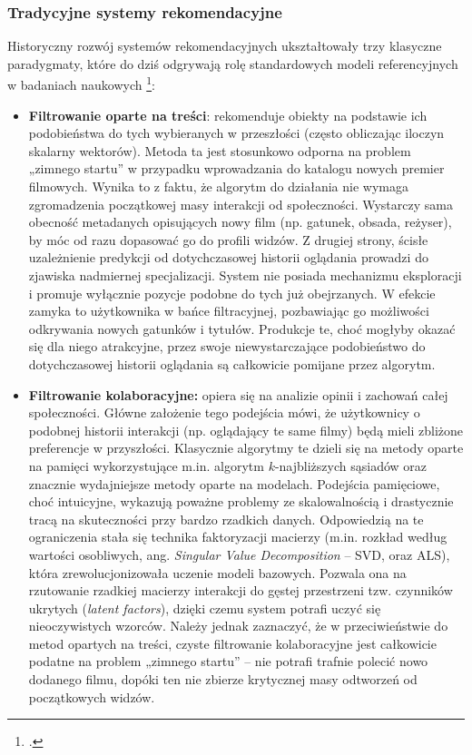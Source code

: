 \vspace{0.5cm}

\vspace{0.5cm}

\subsubsection{Tradycyjne systemy rekomendacyjne}

Historyczny rozwój systemów rekomendacyjnych ukształtowały trzy klasyczne paradygmaty, które do dziś odgrywają rolę standardowych modeli referencyjnych w badaniach naukowych \footcite{suSurveyCollaborativeFiltering2009}:
\begin{itemize}
    \item \textbf{Filtrowanie oparte na treści}: rekomenduje obiekty na podstawie ich podobieństwa do tych wybieranych w przeszłości (często obliczając iloczyn skalarny wektorów). Metoda ta jest stosunkowo odporna na problem „zimnego startu” w przypadku wprowadzania do katalogu nowych premier filmowych. Wynika to z faktu, że algorytm do działania nie wymaga zgromadzenia początkowej masy interakcji od społeczności. Wystarczy sama obecność metadanych opisujących nowy film (np. gatunek, obsada, reżyser), by móc od razu dopasować go do profili widzów. Z drugiej strony, ścisłe uzależnienie predykcji od dotychczasowej historii oglądania prowadzi do zjawiska nadmiernej specjalizacji. System nie posiada mechanizmu eksploracji i promuje wyłącznie pozycje podobne do tych już obejrzanych. W efekcie zamyka to użytkownika w bańce filtracyjnej, pozbawiając go możliwości odkrywania nowych gatunków i tytułów. Produkcje te, choć mogłyby okazać się dla niego atrakcyjne, przez swoje niewystarczające podobieństwo do dotychczasowej historii oglądania są całkowicie pomijane przez algorytm.
    \item \textbf{Filtrowanie kolaboracyjne:} opiera się na analizie opinii i zachowań całej społeczności. Główne założenie tego podejścia mówi, że użytkownicy o podobnej historii interakcji (np. oglądający te same filmy) będą mieli zbliżone preferencje w przyszłości. Klasycznie algorytmy te dzieli się na metody oparte na pamięci wykorzystujące m.in. algorytm $k$-najbliższych sąsiadów oraz znacznie wydajniejsze metody oparte na modelach. Podejścia pamięciowe, choć intuicyjne, wykazują poważne problemy ze skalowalnością i drastycznie tracą na skuteczności przy bardzo rzadkich danych. Odpowiedzią na te ograniczenia stała się technika faktoryzacji macierzy (m.in. rozkład według wartości osobliwych, ang. \foreignlanguage{english}{\textit{Singular Value Decomposition}} -- SVD, oraz ALS), która zrewolucjonizowała uczenie modeli bazowych. Pozwala ona na rzutowanie rzadkiej macierzy interakcji do gęstej przestrzeni tzw. czynników ukrytych (\foreignlanguage{english}{\textit{latent factors}}), dzięki czemu system potrafi uczyć się nieoczywistych wzorców. Należy jednak zaznaczyć, że w przeciwieństwie do metod opartych na treści, czyste filtrowanie kolaboracyjne jest całkowicie podatne na problem „zimnego startu” -- nie potrafi trafnie polecić nowo dodanego filmu, dopóki ten nie zbierze krytycznej masy odtworzeń od początkowych widzów.

\end{itemize}

